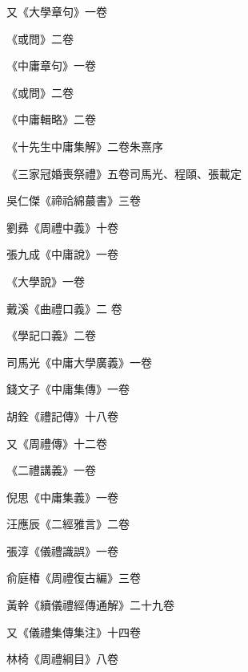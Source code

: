 \begin{pinyinscope}
 又《大學章句》一卷



 《或問》二卷



 《中庸章句》一卷



 《或問》二卷



 《中庸輯略》二卷



 《十先生中庸集解》二卷朱熹序



 《三家冠婚喪祭禮》五卷司馬光、程頤、張載定



 吳仁傑《禘祫綿蕞書》三卷



 劉彞《周禮中義》十卷



 張九成《中庸說》一卷



 《大學說》一卷



 戴溪《曲禮口義》二
 卷



 《學記口義》二卷



 司馬光《中庸大學廣義》一卷



 錢文子《中庸集傳》一卷



 胡銓《禮記傳》十八卷



 又《周禮傳》十二卷



 《二禮講義》一卷



 倪思《中庸集義》一卷



 汪應辰《二經雅言》二卷



 張淳《儀禮識誤》一卷



 俞庭椿《周禮復古編》三卷



 黃幹《續儀禮經傳通解》二十九卷



 又《儀禮集傳集注》十四卷



 林椅《周禮綱目》八卷




\end{pinyinscope}
